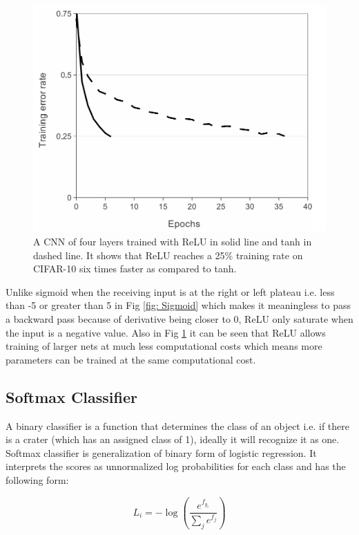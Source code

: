 \documentclass[11pt]{article}
\begin{document}
\begin{figure}[H]
	\includegraphics[width=\linewidth]{files/cnn_architecture/relu_fast.png}
	\caption{A CNN of four layers trained with ReLU in solid line and tanh in dashed line. It shows that ReLU reaches a 25\% training rate on CIFAR-10 six times faster as compared to tanh.}
	\label{fig: relu_fast}
\end{figure}

Unlike sigmoid when the receiving input is at the right or left plateau i.e. less than -5 or greater than 5 in Fig \ref{fig: Sigmoid} which makes it meaningless to pass a backward pass because of derivative being closer to 0, ReLU only saturate when the input is a negative value. Also in Fig \ref{fig: relu_fast} \cite{krizhevsky2012imagenet} it can be seen that ReLU allows training of larger nets at much less computational costs which means more parameters can be trained at the same computational cost.

\subsection{Softmax Classifier}
A binary classifier is a function that determines the class of an object i.e. if there is a crater (which has an assigned class of 1), ideally it will recognize it as one. Softmax classifier is generalization of binary form of logistic regression. It interprets the scores as unnormalized log probabilities for each class and has the following form:

\begin{equation}
\label{singlesoftmax}
L_i = -\log\left(\frac{e^{f_{y_i}}}{ \sum_j e^{f_j} }\right) 
\end{equation}
\end{document}
